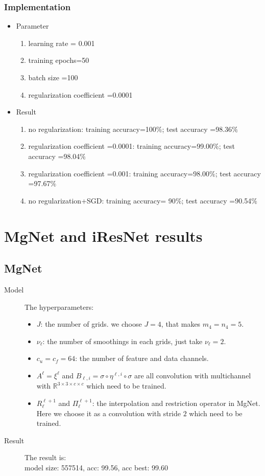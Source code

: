 \subsubsection{Implementation }
\begin{itemize}
\item Parameter
\begin{enumerate}
\item learning rate = 0.001
\item training epochs=50
\item batch size =100
\item regularization coefficient =0.0001
\end{enumerate}
\item Result
\begin{enumerate}
\item no regularization: training accuracy=100$\%$; test accuracy =98.36$\%$
\item regularization coefficient =0.0001: training accuracy=99.00$\%$; test accuracy =98.04$\%$
\item regularization coefficient =0.001: training accuracy=98.00$\%$; test accuracy =97.67$\%$
\item no regularization+SGD: training accuracy= 90$\%$; test accuracy =90.54$\%$
\end{enumerate}

\end{itemize}


\section{MgNet and iResNet results}
\subsection{MgNet}
\begin{description}
	\item[Model] The hyperparameters:
\begin{itemize}
	\item $J$: the number of grids. we choose $J = 4$, that makes $m_4 = n_4 = 5$.
	\item $\nu_\ell$:  the number of smoothings in each grids, 
	just take $\nu_\ell = 2$.
	\item $c_u=c_f = 64$: the number of feature and data channels. 
	\item $A^\ell = \xi^{\ell} $ and $B_{\ell,i} = \sigma \circ \eta^{\ell,i} \circ \sigma $ are all convolution with multichannel with 
	$\mathbb{R}^{3\times3\times c\times c}$
	which need to be trained.
	\item $R_{\ell}^{\ell+1}$ and $\Pi_{\ell}^{\ell+1}$: the interpolation 
	and restriction operator in MgNet.  
	Here we choose it as a convolution with stride $2$ which need to be trained.
\end{itemize}

\item[Result] The result is: \\
model size: 557514, acc: 99.56, acc best: 99.60

\end{description}

